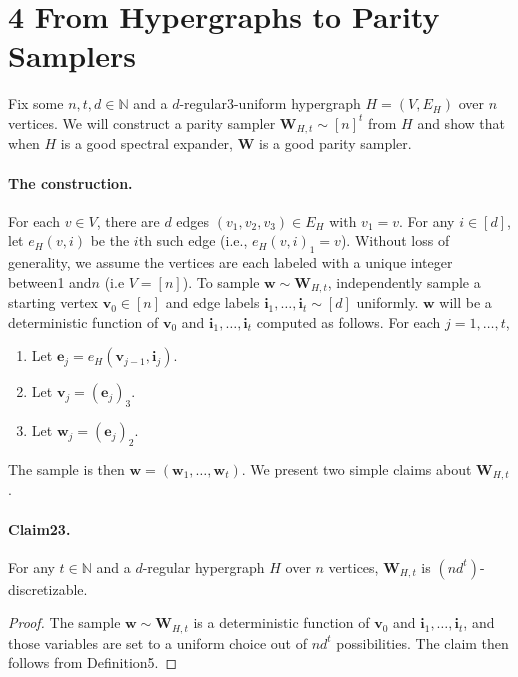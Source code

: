\documentclass[10pt,a4paper]{article}
\begin{document}
\section*{4 From Hypergraphs to Parity Samplers}
Fix some $n,t,d\in\mathbb N$ and a $d$-regular3-uniform hypergraph $H=(V,E_H)$ over $n$ vertices. We will construct a parity sampler $\mathbf W_{H,t}\sim[n]^t$ from $H$ and show that when $H$ is a good spectral expander, $\mathbf W$ is a good parity sampler.
\paragraph{The construction.}
For each $v\in V$, there are $d$ edges $(v_1,v_2,v_3)\in E_H$ with $v_1=v$. For any $i\in[d]$, let $e_H(v,i)$ be the $i$th such edge (i.e., $e_H(v,i)_1=v$). Without loss of generality, we assume the vertices are each labeled with a unique integer between1 and$n$ (i.e $V=[n]$).
To sample $\mathbf w\sim\mathbf W_{H,t}$, independently sample a starting vertex $\mathbf v_0\in[n]$ and edge labels $\mathbf i_1,\ldots,\mathbf i_t\sim[d]$ uniformly. $\mathbf w$ will be a deterministic function of $\mathbf v_0$ and $\mathbf i_1,\ldots,\mathbf i_t$ computed as follows. For each $j=1,\ldots,t$,
\begin{enumerate}
\item Let $\mathbf e_j=e_H(\mathbf v_{j-1},\mathbf i_j)$.
\item Let $\mathbf v_j=(\mathbf e_j)_3$.
\item Let $\mathbf w_j=(\mathbf e_j)_2$.
\end{enumerate}
The sample is then $\mathbf w=(\mathbf w_1,\ldots,\mathbf w_t)$.
We present two simple claims about $\mathbf W_{H,t}$.
\paragraph{Claim23.} For any $t\in\mathbb N$ and a $d$-regular hypergraph $H$ over $n$ vertices, $\mathbf W_{H,t}$ is $(nd^t)$-discretizable.
\begin{proof}
The sample $\mathbf w\sim\mathbf W_{H,t}$ is a deterministic function of $\mathbf v_0$ and $\mathbf i_1,\ldots,\mathbf i_t$, and those variables are set to a uniform choice out of $nd^t$ possibilities. The claim then follows from Definition5.
\end{proof}
\end{document}
